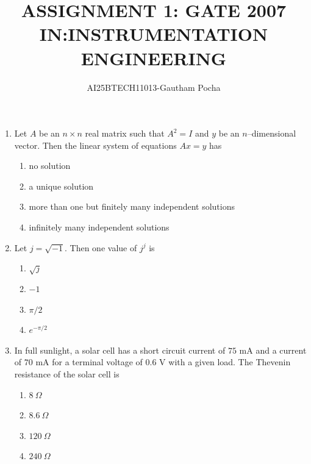 \documentclass[journal]{IEEEtran}
\begin{document}
\title{
ASSIGNMENT 1: GATE 2007 \\
IN:INSTRUMENTATION ENGINEERING}
\author{AI25BTECH11013-Gautham Pocha}
\maketitle
\renewcommand{\thefigure}{\theenumi}
\renewcommand{\thetable}{\theenumi}
\begin{enumerate}

 \item Let $A$ be an $n \times n$ real matrix such that $A^2 = I$ and $y$ be an $n$--dimensional vector. Then the linear system of equations $Ax = y$ has  
\begin{enumerate}
\item no solution
\item a unique solution
\item more than one but finitely many independent solutions
\item infinitely many independent solutions
\end{enumerate}

\item Let $j = \sqrt{-1}$. Then one value of $j^j$ is  
\begin{multicols}{4}
\begin{enumerate}
\item $\sqrt{j}$
\item $-1$
\item $\pi/2$
\item $e^{-\pi/2}$
\end{enumerate}
\end{multicols}

\item In full sunlight, a solar cell has a short circuit current of $75$ mA and a current of $70$ mA for a terminal voltage of $0.6$ V with a given load. The Thevenin resistance of the solar cell is  
\begin{multicols}{4}
\begin{enumerate}
\item $8~\Omega$
\item $8.6~\Omega$
\item $120~\Omega$
\item $240~\Omega$
\end{enumerate}
\end{multicols}


\end{enumerate}
\end{document}
